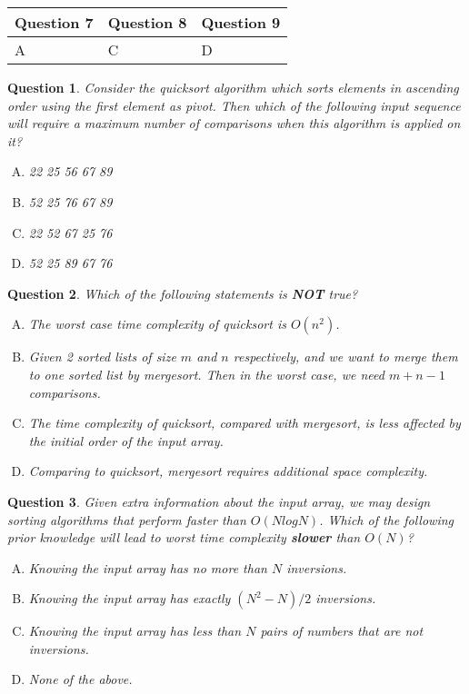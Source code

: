 \documentclass[10.5pt]{article}
\newtheorem{Q}{Question}
\begin{document}
\begin{table}[htbp]
	\begin{tabular}{|p{2cm}|p{2cm}|p{2cm}|}
		\hline 
		Question 7 & Question 8 & Question 9\\
		\hline 
		A&C &D \\ 
		\hline 
	\end{tabular} 
\end{table}


    \begin{Q}
		Consider the quicksort algorithm which sorts elements in ascending order using the first element as pivot. Then which of the following input sequence will require a maximum number of comparisons when this algorithm is applied on it?
		\begin{enumerate}[(A)]
			\item 22 25 56 67 89
			\item 52 25 76 67 89
			\item 22 52 67 25 76
			\item 52 25 89 67 76
		\end{enumerate}
	\end{Q}
	\vspace{0.5cm}
	\begin{Q}
		Which of the following statements is \textbf{NOT} true?
		\begin{enumerate}[(A)]
			\item The worst case time complexity of quicksort is $O(n^2)$.
			\item Given 2 sorted lists of size $m$ and $n$ respectively, and we want to merge them to one sorted list by mergesort. Then in the worst case, we need $m+n-1$ comparisons.
			\item The time complexity of quicksort, compared with mergesort, is less affected by the initial order of the input array.
			\item Comparing to quicksort, mergesort requires additional space complexity.
		\end{enumerate}
	\end{Q}
	\vspace{0.5cm}
	\begin{Q} Given extra information about the input array, we may design sorting algorithms that perform faster than $O(N log N)$. Which of the following prior knowledge will lead to worst time complexity \textbf{slower} than $O(N)$?
		\begin{enumerate}[(A)]
			\item Knowing the input array has no more than $N$ inversions.
			\item Knowing the input array has exactly $(N^2-N)/2$ inversions.
			\item Knowing the input array has less than $N$ pairs of numbers that are not inversions.
			\item None of the above.
		\end{enumerate}
	\end{Q}
	\pagebreak
\end{document}
